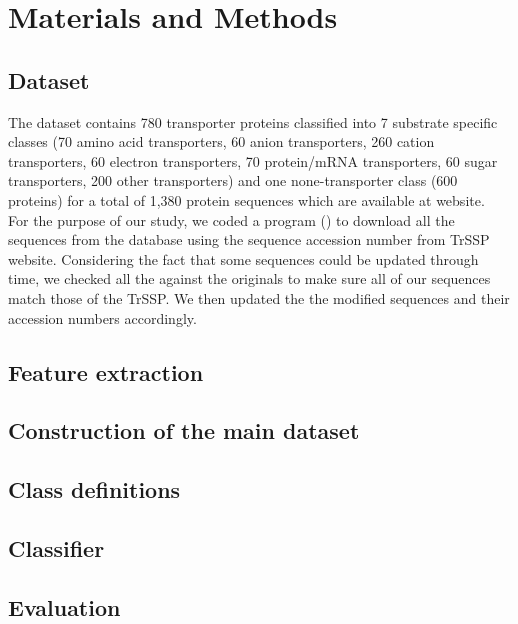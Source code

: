 \section{Materials and Methods}

    \subsection{Dataset}   

    The dataset contains 780 transporter proteins classified into 7 substrate specific classes (70 amino acid transporters, 
    60 anion transporters, 260 cation transporters, 60 electron transporters, 70 protein/mRNA transporters, 60 sugar 
    transporters, 200 other transporters) and one none-transporter class (600 proteins) for a total of 1,380 protein 
    sequences which are available at   website.\\
    For the purpose of our study, we coded a program () to download all the sequences from the 
     database using the sequence accession number from TrSSP website. 
    Considering the fact that some sequences could be updated through time, we checked all the  
    against the originals to make sure all of our sequences match those of the TrSSP. We then updated the 
    the modified sequences and their accession numbers accordingly.

    \subsection{Feature extraction}
    \subsection{Construction of the main dataset}

    \subsection{Class definitions}

    \subsection{Classifier}

    \subsection{Evaluation}
